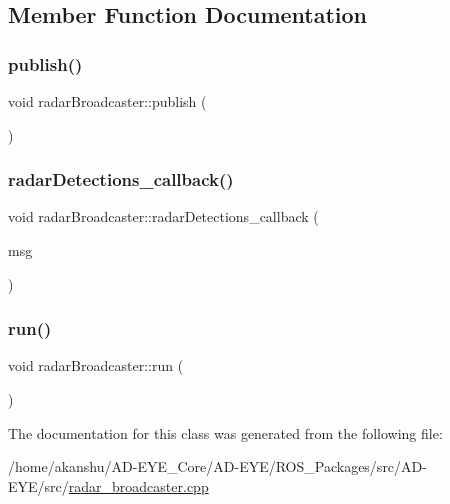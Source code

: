 \subsection{Member Function Documentation}
\mbox{\label{classradarBroadcaster_a6e56183ce61a56dba2b2c7d31fdb27ee}} 
\subsubsection{\texorpdfstring{publish()}{publish()}}
{\footnotesize\ttfamily void radar\+Broadcaster\+::publish (\begin{DoxyParamCaption}{ }\end{DoxyParamCaption})\hspace{0.3cm}{\ttfamily [inline]}}

\mbox{\label{classradarBroadcaster_a7971bbf8d590871d0e45758dbbdf79ec}} 
\subsubsection{\texorpdfstring{radar\+Detections\+\_\+callback()}{radarDetections\_callback()}}
{\footnotesize\ttfamily void radar\+Broadcaster\+::radar\+Detections\+\_\+callback (\begin{DoxyParamCaption}\item[{const std\+\_\+msgs\+::\+Float32\+Multi\+Array\+::\+Const\+Ptr \&}]{msg }\end{DoxyParamCaption})\hspace{0.3cm}{\ttfamily [inline]}}

\mbox{\label{classradarBroadcaster_a5e817100d320a27dfbadb478487e1e79}} 
\subsubsection{\texorpdfstring{run()}{run()}}
{\footnotesize\ttfamily void radar\+Broadcaster\+::run (\begin{DoxyParamCaption}{ }\end{DoxyParamCaption})\hspace{0.3cm}{\ttfamily [inline]}}



The documentation for this class was generated from the following file\+:\begin{DoxyCompactItemize}
\item 
/home/akanshu/\+A\+D-\/\+E\+Y\+E\+\_\+\+Core/\+A\+D-\/\+E\+Y\+E/\+R\+O\+S\+\_\+\+Packages/src/\+A\+D-\/\+E\+Y\+E/src/\hyperlink{radar__broadcaster_8cpp}{radar\+\_\+broadcaster.\+cpp}\end{DoxyCompactItemize}
